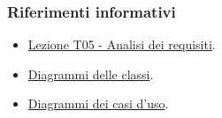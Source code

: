 \subsubsection{Riferimenti informativi}
\begin{itemize}
    \item \href{https://www.math.unipd.it/~tullio/IS-1/2023/Dispense/T5.pdf}{Lezione T05 - Analisi dei requisiti}.
    \item \href{https://www.math.unipd.it/~rcardin/swea/2023/Diagrammi%20delle%20Classi.pdf}{Diagrammi delle classi}.
    \item \href{https://www.math.unipd.it/~rcardin/swea/2022/Diagrammi%20Use%20Case.pdf}{Diagrammi dei casi d'uso}.
\end{itemize}